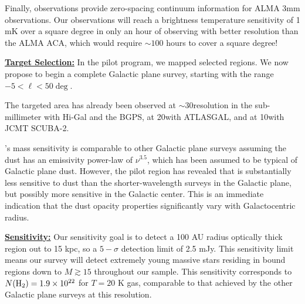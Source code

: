 \documentclass[11pt,preprint]{aastex_nofoot}
\begin{document}
Finally, \MUSTANG observations provide zero-spacing
continuum information for ALMA 3mm observations.  Our observations will reach a
brightness temperature sensitivity of 1 mK over a square degree in only an hour
of observing with better resolution than the ALMA ACA, which would require
$\sim100$ hours to cover a square degree!  

\indent\underline{\textbf{\helv Target Selection:}}
In the pilot program, we mapped selected regions.  We now propose to begin a complete
Galactic plane survey, starting with the range $-5 < \ell < 50\deg$.

The targeted area has already been observed at $\sim$30\arcsec resolution in
the sub-millimeter with Hi-Gal and the BGPS, at 20\arcsec with ATLASGAL, and at
10\arcsec with JCMT SCUBA-2.  

\MUSTANG’s mass sensitivity is comparable to other Galactic plane surveys assuming the
dust has an emissivity power-law of $\nu^{3.5}$, which has been assumed to be
typical of Galactic plane
dust.  However, the pilot region has revealed that \MUSTANG is substantially
less sensitive to dust than the shorter-wavelength surveys in the Galactic plane,
but possibly more sensitive in the Galactic center.  This is an immediate
indication that the dust opacity properties significantly vary with Galactocentric
radius.

\indent\underline{\textbf{\helv Sensitivity:}}  Our sensitivity goal is to
detect a 100 AU radius optically thick \hii region out to 15 kpc, so a
$5-\sigma$ detection limit of 2.5 mJy.  This sensitivity limit means our survey
will detect extremely young massive stars residing in bound \hii regions down
to $M \gtrsim 15$ \msun throughout our sample.  This sensitivity corresponds to
$N(\textrm{H}_{2})=1.9\times10^{22}$ \persc for $T=20$ K gas, comparable to that achieved by the
other Galactic plane surveys at this resolution.


\end{document}
